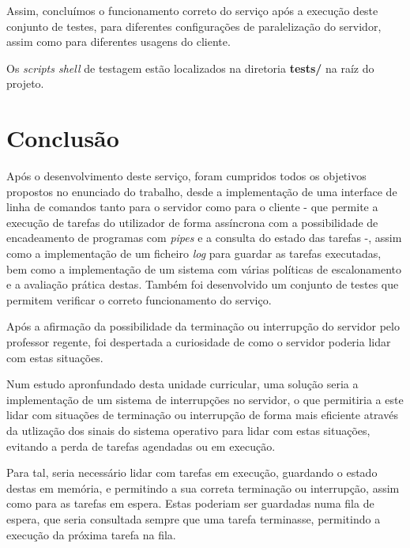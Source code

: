 \documentclass[a4paper,11pt]{scrreprt}
\begin{document}
\begin{minipage}{\textwidth}
    \vspace{1em}

    Assim, concluímos o funcionamento correto do serviço após a execução deste conjunto de testes,
    para diferentes configurações de paralelização do servidor, assim como para diferentes
    usagens do cliente.

    \vspace{1em}

    Os \textit{scripts shell} de testagem estão localizados na diretoria \textbf{tests/}
    na raíz do projeto.
\end{minipage}


\chapter{Conclusão}
    Após o desenvolvimento deste serviço, foram cumpridos todos
    os objetivos propostos no enunciado do trabalho, desde a implementação de
    uma interface de linha de comandos tanto para o servidor como para o cliente -
    que permite a execução de tarefas do utilizador de forma assíncrona com a
    possibilidade de encadeamento de programas com \textit{pipes} e a
    consulta do estado das tarefas -, assim como a implementação de um ficheiro
    \textit{log} para guardar as tarefas executadas, bem como a implementação de um
    sistema com várias políticas de escalonamento e a avaliação prática destas.
    Também foi desenvolvido um conjunto de testes que permitem verificar o correto
    funcionamento do serviço.

    Após a afirmação da possibilidade da terminação ou interrupção do servidor
    pelo professor regente, foi despertada a curiosidade de como o servidor
    poderia lidar com estas situações.

    Num estudo apronfundado desta unidade curricular, uma solução seria a
    implementação de um sistema de interrupções no servidor, o que permitiria
    a este lidar com situações de terminação ou interrupção de forma mais
    eficiente através da utlização dos sinais do sistema operativo para lidar com estas
    situações, evitando a perda de tarefas agendadas ou em execução.

    Para tal, seria necessário lidar com tarefas em execução, guardando
    o estado destas em memória, e permitindo a sua correta terminação
    ou interrupção, assim como para as tarefas em espera. Estas poderiam
    ser guardadas numa fila de espera, que seria consultada sempre que
    uma tarefa terminasse, permitindo a execução da próxima tarefa na
    fila.
\end{document}

